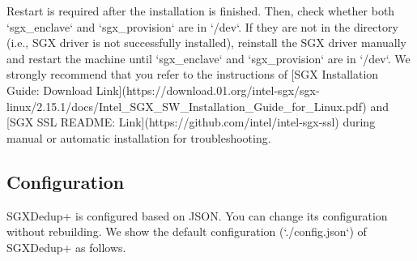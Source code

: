 Restart is required after the installation is finished. Then, check whether both `sgx\_enclave` and `sgx\_provision` are in `/dev`. If they are not in the directory (i.e., SGX driver is not successfully installed), reinstall the SGX driver manually and restart the machine until `sgx\_enclave` and `sgx\_provision` are in `/dev`. We strongly recommend that you refer to the instructions of [SGX Installation Guide: Download Link](https://download.01.org/intel-sgx/sgx-linux/2.15.1/docs/Intel\_SGX\_SW\_Installation\_Guide\_for\_Linux.pdf) and [SGX SSL README: Link](https://github.com/intel/intel-sgx-ssl) during manual or automatic installation for troubleshooting.


\subsection{Configuration}

SGXDedup+ is configured based on JSON. You can change its configuration without rebuilding. We show the default configuration (`./config.json`) of SGXDedup+ as follows.

